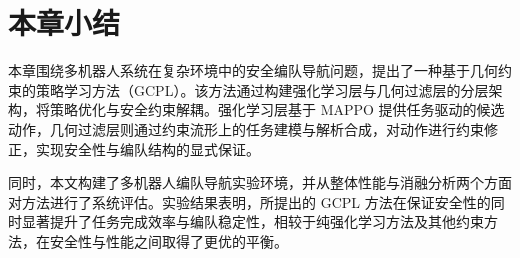 \section{本章小结}

本章围绕多机器人系统在复杂环境中的安全编队导航问题，提出了一种基于几何约束的策略学习方法（GCPL）。该方法通过构建强化学习层与几何过滤层的分层架构，将策略优化与安全约束解耦。强化学习层基于 MAPPO 提供任务驱动的候选动作，几何过滤层则通过约束流形上的任务建模与解析合成，对动作进行约束修正，实现安全性与编队结构的显式保证。

同时，本文构建了多机器人编队导航实验环境，并从整体性能与消融分析两个方面对方法进行了系统评估。实验结果表明，所提出的 GCPL 方法在保证安全性的同时显著提升了任务完成效率与编队稳定性，相较于纯强化学习方法及其他约束方法，在安全性与性能之间取得了更优的平衡。
